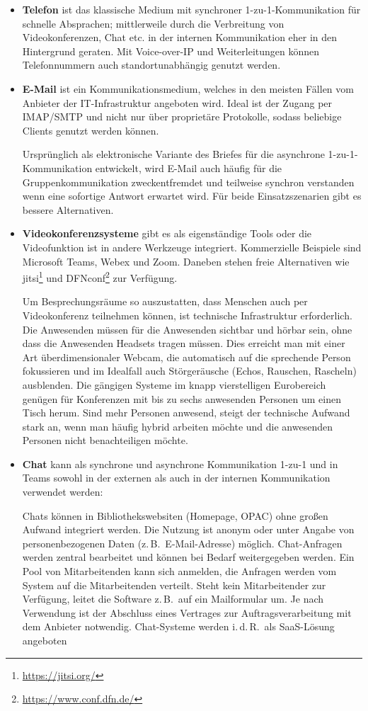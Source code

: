 \documentclass[
  11pt,
  letterpaper,
  DIV=11,
  twoside]{scrreprt}
\DeclareRobustCommand{\href}[2]{#2\footnote{\url{#1}}}
\begin{document}
\begin{itemize}
\item
  \textbf{Telefon} ist das klassische Medium mit synchroner
  1-zu-1-Kommunikation für schnelle Absprachen; mittlerweile durch die
  Verbreitung von Videokonferenzen, Chat etc. in der internen
  Kommunikation eher in den Hintergrund geraten. Mit Voice-over-IP und
  Weiterleitungen können Telefonnummern auch standortunabhängig genutzt
  werden.
\item
  \textbf{E-Mail} ist ein Kommunikationsmedium, welches in den meisten
  Fällen vom Anbieter der IT-Infrastruktur angeboten wird. Ideal ist der
  Zugang per IMAP/SMTP und nicht nur über proprietäre Protokolle, sodass
  beliebige Clients genutzt werden können.

  Ursprünglich als elektronische Variante des Briefes für die asynchrone
  1-zu-1-Kommunikation entwickelt, wird E-Mail auch häufig für die
  Gruppenkommunikation zweckentfremdet und teilweise synchron verstanden
  wenn eine sofortige Antwort erwartet wird. Für beide Einsatzszenarien
  gibt es bessere Alternativen.
\item
  \textbf{Videokonferenzsysteme} gibt es als eigenständige Tools oder
  die Videofunktion ist in andere Werkzeuge integriert. Kommerzielle
  Beispiele sind Microsoft Teams, Webex und Zoom. Daneben stehen freie
  Alternativen wie \href{https://jitsi.org/}{jitsi} und
  \href{https://www.conf.dfn.de/}{DFNconf} zur Verfügung.

  Um Besprechungsräume so auszustatten, dass Menschen auch per
  Videokonferenz teilnehmen können, ist technische Infrastruktur
  erforderlich. Die Anwesenden müssen für die Anwesenden sichtbar und
  hörbar sein, ohne dass die Anwesenden Headsets tragen müssen. Dies
  erreicht man mit einer Art überdimensionaler Webcam, die automatisch
  auf die sprechende Person fokussieren und im Idealfall auch
  Störgeräusche (Echos, Rauschen, Rascheln) ausblenden. Die gängigen
  Systeme im knapp vierstelligen Eurobereich genügen für Konferenzen mit
  bis zu sechs anwesenden Personen um einen Tisch herum. Sind mehr
  Personen anwesend, steigt der technische Aufwand stark an, wenn man
  häufig hybrid arbeiten möchte und die anwesenden Personen nicht
  benachteiligen möchte.
\item
  \textbf{Chat} kann als synchrone und asynchrone Kommunikation 1-zu-1
  und in Teams sowohl in der externen als auch in der internen
  Kommunikation verwendet werden:

  Chats können in Bibliothekswebsiten (Homepage, OPAC) ohne großen
  Aufwand integriert werden. Die Nutzung ist anonym oder unter Angabe
  von personenbezogenen Daten (z.\,B.~E-Mail-Adresse) möglich.
  Chat-Anfragen werden zentral bearbeitet und können bei Bedarf
  weitergegeben werden. Ein Pool von Mitarbeitenden kann sich anmelden,
  die Anfragen werden vom System auf die Mitarbeitenden verteilt. Steht
  kein Mitarbeitender zur Verfügung, leitet die Software z.\,B.~auf ein
  Mailformular um. Je nach Verwendung ist der Abschluss eines Vertrages
  zur Auftragsverarbeitung mit dem Anbieter notwendig. Chat-Systeme
  werden i.\,d.\,R.~als {SaaS}-Lösung angeboten


\end{itemize}
\end{document}
